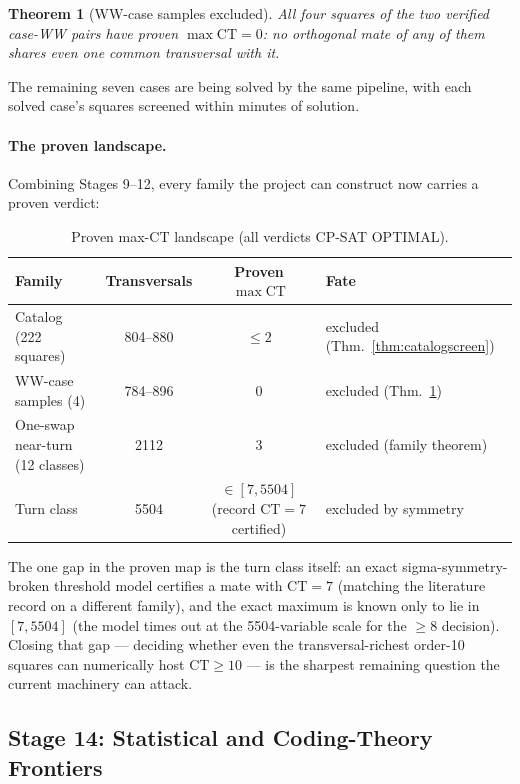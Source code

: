 \documentclass[11pt,a4paper]{article}
\newtheorem{theorem}{Theorem}[section]
\theoremstyle{remark}
\newcommand{\CT}{\mathrm{CT}}
\begin{document}
\begin{theorem}[WW-case samples excluded]\label{thm:ww}
All four squares of the two verified case-WW pairs have proven
$\max \CT = 0$: no orthogonal mate of any of them shares even one
common transversal with it.
\end{theorem}

The remaining seven cases are being solved by the same pipeline, with
each solved case's squares screened within minutes of solution.

\paragraph{The proven landscape.} Combining Stages 9--12, every family
the project can construct now carries a proven verdict:

\begin{table}[h]
\centering
\caption{Proven max-$\CT$ landscape (all verdicts CP-SAT OPTIMAL).}
\label{tab:provenmap}
\begin{tabular}{lccl}
\toprule
Family & Transversals & Proven $\max \CT$ & Fate\\
\midrule
Catalog (222 squares) & 804--880 & $\leq 2$ & excluded (Thm.~\ref{thm:catalogscreen})\\
WW-case samples (4) & 784--896 & 0 & excluded (Thm.~\ref{thm:ww})\\
One-swap near-turn (12 classes) & 2112 & 3 & excluded (family theorem)\\
Turn class & 5504 & $\in[7,5504]$ (record $\CT{=}7$ certified) & excluded by symmetry~\cite{mmm2007}\\
\bottomrule
\end{tabular}
\end{table}

The one gap in the proven map is the turn class itself: an exact
sigma-symmetry-broken threshold model certifies a mate with $\CT = 7$
(matching the literature record on a different family), and the exact
maximum is known only to lie in $[7, 5504]$ (the model times out at the
5504-variable scale for the $\geq 8$ decision). Closing that gap ---
deciding whether even the transversal-richest order-10 squares can
numerically host $\CT \geq 10$ --- is the sharpest remaining question the
current machinery can attack.

\subsection{Stage 14: Statistical and Coding-Theory Frontiers}
\label{sec:stage14}
\end{document}
